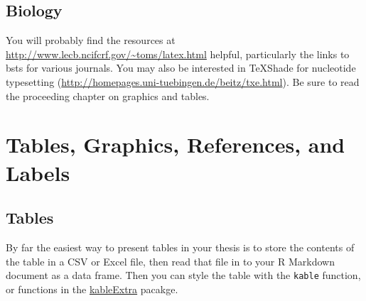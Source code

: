 \documentclass[twoside,12pt,final]{ucthesis-CA2012}
\begin{document}
\begin{ucmainmatter}
\hypertarget{biology}{%
\section{Biology}\label{biology}}

You will probably find the resources at \url{http://www.lecb.ncifcrf.gov/~toms/latex.html} helpful, particularly the links to bsts for various journals. You may also be interested in TeXShade for nucleotide typesetting (\url{http://homepages.uni-tuebingen.de/beitz/txe.html}). Be sure to read the proceeding chapter on graphics and tables.

\hypertarget{ref-labels}{%
\chapter{Tables, Graphics, References, and Labels}\label{ref-labels}}

\hypertarget{tables}{%
\section{Tables}\label{tables}}

By far the easiest way to present tables in your thesis is to store the contents of the table in a CSV or Excel file, then read that file in to your R Markdown document as a data frame. Then you can style the table with the \texttt{kable} function, or functions in the \href{https://cran.r-project.org/web/packages/kableExtra/index.html}{kableExtra} pacakge.


\end{ucmainmatter}
\end{document}
